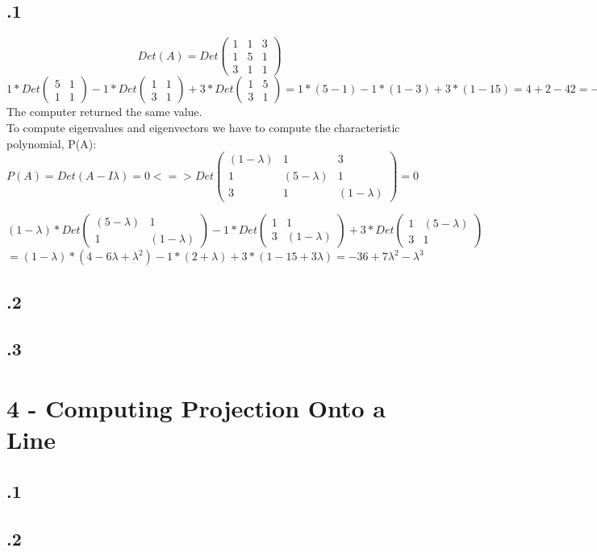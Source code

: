 \documentclass[a4paper]{article}
\begin{document}
\subsection*{.1}
$$ Det(A) = Det\left( \begin{matrix} 1 & 1 & 3 \\ 1 & 5 & 1 \\ 3 & 1 & 1 \end{matrix} \right)$$
$1 * Det \left( \begin{matrix} 5 & 1 \\ 1 & 1 \end{matrix} \right) - 1 * Det \left( \begin{matrix} 1 & 1 \\ 3 & 1 \end{matrix} \right) + 3 * Det \left( \begin{matrix} 1 & 5 \\ 3 & 1 \end{matrix} \right) = 1 * (5 - 1) -1 * (1 - 3) + 3 * (1 - 15) = 4 + 2 -42 = -36$\\
The computer returned the same value.\\
To compute eigenvalues and eigenvectors we have to compute the characteristic polynomial, P(A):\\
$$ P(A) = Det(A - I\lambda)= 0 <=> Det\left( \begin{matrix} (1 - \lambda) & 1 & 3 \\ 1 & (5 - \lambda) & 1 \\ 3 & 1 & (1 - \lambda) \end{matrix} \right) = 0$$

$(1 - \lambda) * Det \left( \begin{matrix} (5 - \lambda) & 1 \\ 1 & (1 - \lambda) \end{matrix} \right) - 1 * Det \left( \begin{matrix} 1 & 1 \\ 3 & (1 - \lambda) \end{matrix} \right) + 3 * Det \left( \begin{matrix} 1 & (5 - \lambda) \\ 3 & 1 \end{matrix} \right) $\\$= (1 - \lambda) * (4 - 6\lambda + \lambda^{2}) - 1 * (2 + \lambda) + 3 * (1 - 15 + 3\lambda) = -36 + 7\lambda^{2} - \lambda^{3} $\\
\subsection*{.2}
\subsection*{.3}

\section*{4 - Computing Projection Onto a Line}
\subsection*{.1}
\subsection*{.2}
\end{document}
